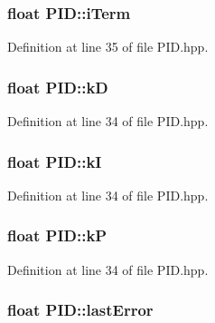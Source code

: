 \hypertarget{classPID_a940a94095581f2d32d1ed3426a2cdf4b}{
\subsubsection[{i\-Term}]{\setlength{\rightskip}{0pt plus 5cm}float P\-I\-D\-::i\-Term}}\label{classPID_a940a94095581f2d32d1ed3426a2cdf4b}


Definition at line 35 of file P\-I\-D.\-hpp.

\hypertarget{classPID_a5a07dca1e267a62af08ebd07781f1e9e}{
\subsubsection[{k\-D}]{\setlength{\rightskip}{0pt plus 5cm}float P\-I\-D\-::k\-D}}\label{classPID_a5a07dca1e267a62af08ebd07781f1e9e}


Definition at line 34 of file P\-I\-D.\-hpp.

\hypertarget{classPID_ac686925341bcab06b11df109533b6807}{
\subsubsection[{k\-I}]{\setlength{\rightskip}{0pt plus 5cm}float P\-I\-D\-::k\-I}}\label{classPID_ac686925341bcab06b11df109533b6807}


Definition at line 34 of file P\-I\-D.\-hpp.

\hypertarget{classPID_ac4815cca85109a6e13b10c2415104328}{
\subsubsection[{k\-P}]{\setlength{\rightskip}{0pt plus 5cm}float P\-I\-D\-::k\-P}}\label{classPID_ac4815cca85109a6e13b10c2415104328}


Definition at line 34 of file P\-I\-D.\-hpp.

\hypertarget{classPID_abf0cc22331707048925c27a242be7d3e}{
\subsubsection[{last\-Error}]{\setlength{\rightskip}{0pt plus 5cm}float P\-I\-D\-::last\-Error}}\label{classPID_abf0cc22331707048925c27a242be7d3e}


